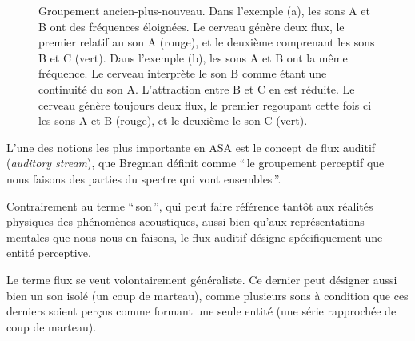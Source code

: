 \begin{figure}[bth]
        \myfloatalign
        \caption[Groupement ancien-plus-nouveau]{Groupement ancien-plus-nouveau. Dans l'exemple (a), les sons A et B ont des fréquences éloignées. Le cerveau génère deux flux, le premier relatif au son A (rouge), et le deuxième comprenant les sons B et C (vert). Dans l'exemple (b), les sons A et B ont la même fréquence. Le cerveau interprète le son B comme étant une continuité du son A. L'attraction entre B et C en est réduite. Le cerveau génère toujours deux flux, le premier regoupant cette fois ci les sons A et B (rouge), et le deuxième le son C (vert).}\label{fig:oldplusnew}
\end{figure}

L'une des notions les plus importante en ASA est le concept de flux auditif (\emph{auditory stream}), que Bregman définit comme ``\,le groupement perceptif que nous faisons des parties du spectre qui vont ensembles\,''.

Contrairement au terme ``\,son\,'', qui peut faire référence tantôt aux réalités physiques des phénomènes acoustiques, aussi bien qu'aux représentations mentales que nous nous en faisons, le flux auditif désigne spécifiquement une entité perceptive.

Le terme flux se veut volontairement généraliste. Ce dernier peut désigner aussi bien un son isolé (un coup de marteau), comme plusieurs sons à condition que ces derniers soient perçus comme formant une seule entité (une série rapprochée de coup de marteau).

